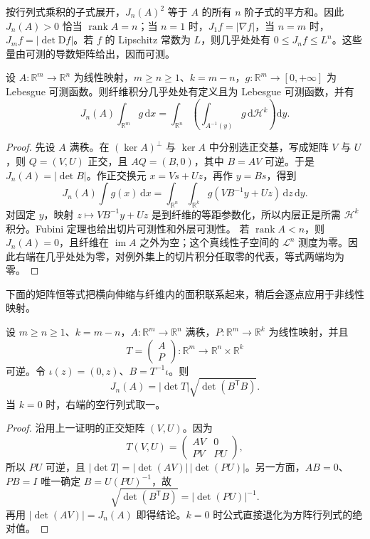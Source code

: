 按行列式乘积的子式展开，\(J_n(A)^2\) 等于 \(A\) 的所有 \(n\) 阶子式的平方和。因此 \(J_n(A)>0\) 恰当 \(\operatorname{rank}A=n\)；当 \(n=1\) 时，\(J_1f=|\nabla f|\)，当 \(n=m\) 时，\(J_mf=|\det\mathrm Df|\)。若 \(f\) 的 Lipschitz 常数为 \(L\)，则几乎处处有 \(0\le J_nf\le L^n\)。这些量由可测的导数矩阵给出，因而可测。

\begin{proposition}\label{g3:prop:linear-coarea}
	设 \(A:\mathbb R^m\to\mathbb R^n\) 为线性映射，\(m\ge n\ge1\)、\(k=m-n\)，\(g:\mathbb R^m\to[0,+\infty]\) 为 Lebesgue 可测函数。则纤维积分几乎处处有定义且为 Lebesgue 可测函数，并有
	\[
		J_n(A)\int_{\mathbb R^m}g\,\mathrm dx
		=\int_{\mathbb R^n}\left(\int_{A^{-1}(y)}g\,\mathrm d\mathcal H^k\right)\mathrm dy.
	\]
\end{proposition}
\begin{proof}
	先设 \(A\) 满秩。在 \((\ker A)^\perp\) 与 \(\ker A\) 中分别选正交基，写成矩阵 \(V\) 与 \(U\)，则 \(Q=(V,U)\) 正交，且 \(AQ=(B,0)\)，其中 \(B=AV\) 可逆。于是 \(J_n(A)=|\det B|\)。作正交换元 \(x=Vs+Uz\)，再作 \(y=Bs\)，得到
	\[
		J_n(A)\int g(x)\,\mathrm dx
		=\int_{\mathbb R^n}\int_{\mathbb R^k}
		g(VB^{-1}y+Uz)\,\mathrm dz\,\mathrm dy.
	\]
	对固定 \(y\)，映射 \(z\mapsto VB^{-1}y+Uz\) 是到纤维的等距参数化，所以内层正是所需 \(\mathcal H^k\) 积分。Fubini 定理也给出切片可测性和外层可测性。
	若 \(\operatorname{rank}A<n\)，则 \(J_n(A)=0\)，且纤维在 \(\operatorname{im}A\) 之外为空；这个真线性子空间的 \(\mathcal L^n\) 测度为零。因此右端在几乎处处为零，对例外集上的切片积分任取零的代表，等式两端均为零。
\end{proof}

下面的矩阵恒等式把横向伸缩与纤维内的面积联系起来，稍后会逐点应用于非线性映射。

\begin{lemma}\label{g3:lem:coarea-linear-block-identity}
	设 \(m\ge n\ge1\)、\(k=m-n\)，\(A:\mathbb R^m\to\mathbb R^n\) 满秩，\(P:\mathbb R^m\to\mathbb R^k\) 为线性映射，并且
	\[
		T=\begin{pmatrix}A\\P\end{pmatrix}:\mathbb R^m\longrightarrow\mathbb R^n\times\mathbb R^k
	\]
	可逆。令 \(\iota(z)=(0,z)\)、\(B=T^{-1}\iota\)。则
	\begin{equation}\label{g3:eq:coarea-linear-block-identity}
		J_n(A)=|\det T|\sqrt{\det(B^{\mathsf T}B)}.
	\end{equation}
	当 \(k=0\) 时，右端的空行列式取一。
\end{lemma}
\begin{proof}
	沿用上一证明的正交矩阵 \((V,U)\)。因为
	\[
		T(V,U)=\begin{pmatrix}AV&0\\PV&PU\end{pmatrix},
	\]
	所以 \(PU\) 可逆，且 \(|\det T|=|\det(AV)|\,|\det(PU)|\)。另一方面，\(AB=0\)、\(PB=I\) 唯一确定 \(B=U(PU)^{-1}\)，故
	\[
		\sqrt{\det(B^{\mathsf T}B)}=|\det(PU)|^{-1}.
	\]
	再用 \(|\det(AV)|=J_n(A)\) 即得结论。\(k=0\) 时公式直接退化为方阵行列式的绝对值。
\end{proof}

